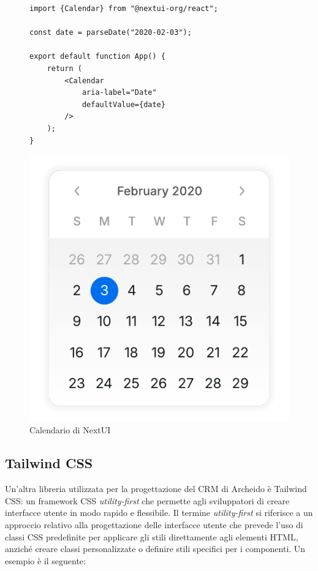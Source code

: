 \documentclass[target=bach,aauheader=,style=]{thud}
\begin{document}
\begin{figure}[H]
    \centering
    \begin{minipage}{0.6\textwidth}
        \begin{lstlisting}[caption=Uso di un componente NextUI]
import {Calendar} from "@nextui-org/react";

const date = parseDate("2020-02-03");
    
export default function App() {
    return (
        <Calendar 
            aria-label="Date" 
            defaultValue={date} 
        /> 
    );
}
        \end{lstlisting}
    \end{minipage}%
    \hfill
    \begin{minipage}{0.35\textwidth}
        \centering
        \includegraphics[width=\textwidth]{img/calendar.pdf}
        \caption{Calendario di NextUI}
        \label{calendar}
    \end{minipage}
\end{figure}

\subsection{Tailwind CSS}
\noindent Un'altra libreria utilizzata per la progettazione del CRM di Archeido è Tailwind CSS: un framework CSS \textit{utility-first} che permette agli sviluppatori di creare interfacce utente in modo rapido e flessibile. Il termine \textit{utility-first} si riferisce a un approccio relativo alla progettazione delle interfacce utente che prevede l'uso di classi CSS predefinite per applicare gli stili direttamente agli elementi HTML, anziché creare classi personalizzate o definire stili specifici per i componenti. Un esempio è il seguente:
\end{document}
